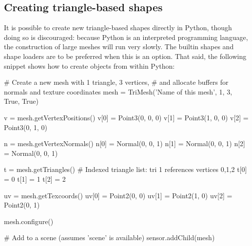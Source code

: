 \subsection{Creating triangle-based shapes}
It is possible to create new triangle-based shapes directly in Python, though
doing so is discouraged: because Python is an interpreted programming language,
the construction of large meshes will run very slowly. The builtin shapes
and shape loaders are to be preferred when this is an option. That said, the
following snippet shows how to create  objects from within Python:
\begin{python}
# Create a new mesh with 1 triangle, 3 vertices,
# and allocate buffers for normals and texture coordinates
mesh = TriMesh('Name of this mesh', 1, 3, True, True)

v = mesh.getVertexPositions()
v[0] = Point3(0, 0, 0)
v[1] = Point3(1, 0, 0)
v[2] = Point3(0, 1, 0)

n = mesh.getVertexNormals()
n[0] = Normal(0, 0, 1)
n[1] = Normal(0, 0, 1)
n[2] = Normal(0, 0, 1)

t = mesh.getTriangles() # Indexed triangle list: tri 1 references vertices 0,1,2
t[0] = 0
t[1] = 1
t[2] = 2

uv = mesh.getTexcoords()
uv[0] = Point2(0, 0)
uv[1] = Point2(1, 0)
uv[2] = Point2(0, 1)

mesh.configure()

# Add to a scene (assumes 'scene' is available)
sensor.addChild(mesh)
\end{python}


